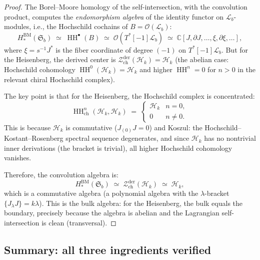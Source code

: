 \documentclass[11pt]{article}
\newcommand{\cO}{\mathcal{O}}
\newcommand{\cH}{\mathcal{H}}
\newcommand{\cZ}{\mathcal{Z}}
\newcommand{\cL}{\mathcal{L}}
\newcommand{\C}{\mathbb{C}}
\newcommand{\HH}{\operatorname{HH}}
\newcommand{\Zder}{\cZ^{\mathrm{der}}_{\mathrm{ch}}}
\begin{document}
\begin{proof}
The Borel--Moore homology of the self-intersection, with the
convolution product, computes the \emph{endomorphism algebra} of
the identity functor on $\cL_b$-modules, i.e., the Hochschild
cochains of $B = \cO(\cL_b)$:
\[
H_*^{\mathrm{BM}}(\mathfrak{S}_b)
\;\simeq\;
\HH^\bullet(B)
\;\simeq\;
\cO(T^*[-1]\cL_b)
\;\simeq\;
\C[J, \partial J, \ldots, \xi, \partial\xi, \ldots],
\]
where $\xi = s^{-1}J^*$ is the fiber coordinate of degree $(-1)$ on
$T^*[-1]\cL_b$.  But for the Heisenberg, the derived center is
$\Zder(\cH_k) = \cH_k$ (the abelian case: Hochschild cohomology
$\HH^0(\cH_k) = \cH_k$ and higher $\HH^n = 0$ for $n > 0$ in the
relevant chiral Hochschild complex).

The key point is that for the Heisenberg, the Hochschild complex
is concentrated:
\[
\HH^n_{\mathrm{ch}}(\cH_k, \cH_k)
\;=\;
\begin{cases}
\cH_k & n = 0, \\
0 & n \ne 0.
\end{cases}
\]
This is because $\cH_k$ is commutative ($J_{(0)}J = 0$) and Koszul:
the Hochschild--Kostant--Rosenberg spectral sequence degenerates,
and since $\cH_k$ has no nontrivial inner derivations (the bracket
is trivial), all higher Hochschild cohomology vanishes.

Therefore, the convolution algebra is:
\[
H_*^{\mathrm{BM}}(\mathfrak{S}_b)
\;\simeq\;
\Zder(\cH_k)
\;\simeq\;
\cH_k,
\]
which is a commutative algebra (a polynomial algebra with the
$\lambda$-bracket $\{J_\lambda J\} = k\lambda$).  This is the
bulk algebra: for the Heisenberg, the bulk equals the boundary,
precisely because the algebra is abelian and the Lagrangian
self-intersection is clean (transversal).
\end{proof}

\subsection{Summary: all three ingredients verified}
\end{document}
